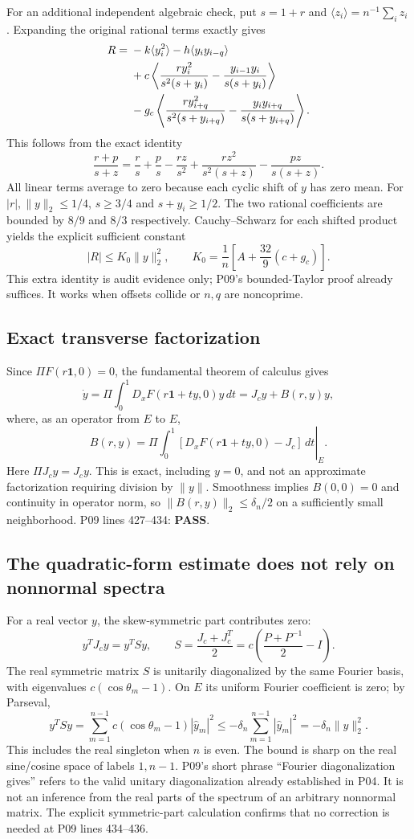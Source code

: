 \documentclass[11pt]{article}
\newcommand{\one}{\mathbf{1}}
\newcommand{\norm}[1]{\lVert#1\rVert}
\newcommand{\lin}[1]{P09 lines #1}
\newcommand{\pass}{\textbf{PASS}}
\begin{document}
For an additional independent algebraic check, put $s=1+r$ and
$\langle z_i\rangle=n^{-1}\sum_i z_i$. Expanding the original rational
terms exactly gives
\begin{align}
 R={}&-k\langle y_i^2\rangle-h\langle y_i y_{i-q}\rangle\notag\\
 &+c\left\langle\frac{r y_i^2}{s^2(s+y_i)}
              -\frac{y_{i-1}y_i}{s(s+y_i)}\right\rangle\notag\\
 &-g_c\left\langle\frac{r y_{i+q}^2}{s^2(s+y_{i+q})}
              -\frac{y_i y_{i+q}}{s(s+y_{i+q})}\right\rangle.
 \label{eq:explicitR}
\end{align}
This follows from the exact identity
\[
 \frac{r+p}{s+z}=\frac rs+\frac ps-\frac{rz}{s^2}
      +\frac{rz^2}{s^2(s+z)}-\frac{pz}{s(s+z)}.
\]
All linear terms average to zero because each cyclic shift of $y$ has
zero mean. For $|r|,\norm y_2\le1/4$, $s\ge3/4$ and
$s+y_i\ge1/2$. The two rational coefficients are bounded by $8/9$ and
$8/3$ respectively. Cauchy--Schwarz for each shifted product yields the
explicit sufficient constant
\[
 |R|\le K_0\norm y_2^2,\qquad
 K_0=\frac1n\left[A+\frac{32}{9}(c+g_c)\right].
\]
This extra identity is audit evidence only; P09's bounded-Taylor proof
already suffices. It works when offsets collide or $n,q$ are noncoprime.

\subsection{Exact transverse factorization}
Since $\Pi F(r\one,0)=0$, the fundamental theorem of calculus gives
\[
 \dot y=\Pi\int_0^1D_xF(r\one+t y,0)y\,dt
       =J_cy+B(r,y)y,
\]
where, as an operator from $E$ to $E$,
\[
 B(r,y)=\left.\Pi\int_0^1[D_xF(r\one+t y,0)-J_c]\,dt\right|_E.
\]
Here $\Pi J_cy=J_cy$. This is exact, including $y=0$, and not an
approximate factorization requiring division by $\norm y$. Smoothness
implies $B(0,0)=0$ and continuity in operator norm, so
$\norm{B(r,y)}_2\le\delta_n/2$ on a sufficiently small neighborhood.
\lin{427--434}: \pass.

\subsection{The quadratic-form estimate does not rely on nonnormal spectra}
For a real vector $y$, the skew-symmetric part contributes zero:
\[
 y^TJ_cy=y^TSy,\qquad
 S=\frac{J_c+J_c^T}{2}=c\left(\frac{P+P^{-1}}2-I\right).
\]
The real symmetric matrix $S$ is unitarily diagonalized by the same
Fourier basis, with eigenvalues $c(\cos\theta_m-1)$. On $E$ its
uniform Fourier coefficient is zero; by Parseval,
\[
 y^TSy=\sum_{m=1}^{n-1}c(\cos\theta_m-1)|\widehat y_m|^2
 \le-\delta_n\sum_{m=1}^{n-1}|\widehat y_m|^2
 =-\delta_n\norm y_2^2.
\]
This includes the real singleton when $n$ is even. The bound is sharp on
the real sine/cosine space of labels $1,n-1$. P09's short phrase
``Fourier diagonalization gives'' refers to the valid unitary
diagonalization already established in P04. It is not an inference
from the real parts of the spectrum of an arbitrary nonnormal matrix.
The explicit symmetric-part calculation confirms that no correction is
needed at \lin{434--436}.
\end{document}
